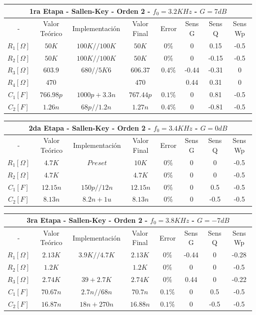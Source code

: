 \begin{table}[H]
\centering
\begin{tabular}{@{}cccccccc@{}}
\multicolumn{8}{c}{1ra Etapa - Sallen-Key - Orden 2 - $f_0 = 3.2KHz$ - $G=7dB$} \\ \midrule
- & Valor Teórico & Implementación & Valor Final & Error & Sens G & Sens Q & Sens Wp \\ \midrule
$R_1 [\Omega]$ & $50K$ & $100K//100K$ & $50K$ & $0\%$ & 0 & 0.15 & -0.5 \\
$R_2 [\Omega]$ & $50K$ & $100K//100K$ & $50K$ & $0\%$ & 0 & -0.15 & -0.5 \\
$R_3 [\Omega]$ & $603.9$ & $680//5K6$ & $606.37$ & $0.4\%$ & -0.44 & -0.31 & 0 \\
$R_4 [\Omega]$ & $470$ &  & $470$ &  & 0.44 & 0.31 & 0 \\
$C_1 [F]$ & $766.98p$ & $1000p+3.3n$ & $767.44p$ & $0.1\%$ & 0 & 0.81 & -0.5 \\
$C_2 [F]$ & $1.26n$ & $68p//1.2n$ & $1.27n$ & $0.4\%$ & 0 & -0.81 & -0.5 \\ \bottomrule
\end{tabular}
\end{table}

\begin{table}[H]
\centering
\begin{tabular}{@{}cccccccc@{}}
\multicolumn{8}{c}{2da Etapa - Sallen-Key - Orden 2 - $f_0 = 3.4KHz$ - $G=0dB$} \\ \midrule
- & Valor Teórico & Implementación & Valor Final & Error & Sens G & Sens Q & Sens Wp \\ \midrule
$R_1 [\Omega]$ & $4.7K$ & $Preset$ & $10K$ & $0\%$ & 0 & 0 & -0.5 \\
$R_2 [\Omega]$ & $4.7K$ &  & $4.7K$ & $0\%$ & 0 & 0 & -0.5 \\
$C_1 [F]$ & $12.15n$ & $150p//12n$ & $12.15n$ & $0\%$ & 0 & 0.5 & -0.5 \\
$C_2 [F]$ & $8.13n$ & $8.2n+1u$ & $8.13n$ & $0\%$ & 0 & -0.5 & -0.5 \\ \bottomrule
\end{tabular}
\end{table}
 
\begin{table}[H]
\centering
\begin{tabular}{@{}cccccccc@{}}
\multicolumn{8}{c}{3ra Etapa - Sallen-Key - Orden 2 - $f_0 = 3.8KHz$ - $G=-7dB$} \\ \midrule
- & Valor Teórico & Implementación & Valor Final & Error & Sens G & Sens Q & Sens Wp \\ \midrule
$R_1 [\Omega]$ & $2.13K$ & $3.9K//4.7K$ & $2.13K$ & $0\%$ & -0.44 & 0 & -0.28 \\
$R_2 [\Omega]$ & $1.2K$ &  & $1.2K$ & $0\%$ & 0 & 0 & -0.5 \\
$R_3 [\Omega]$ & $2.74K$ & $39+2.7K$ & $2.74K$ & $0\%$ & 0.44 & 0 & -0.22 \\
$C_1 [F]$ & $70.67n$ & $2.7n//68n$ & $70.7n$ & $0.1\%$ & 0 & 0.5 & -0.5 \\
$C_2 [F]$ & $16.87n$ & $18n+270n$ & $16.88n$ & $0.1\%$ & 0 & -0.5 & -0.5 \\ \bottomrule
\end{tabular}
\end{table}

